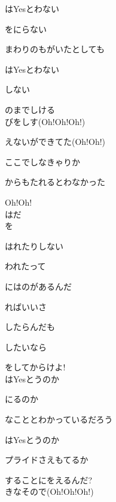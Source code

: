 はYesとわない

をにらない

まわりのもがいたとしても

はYesとわない

 しない

のまでしける
\\

びをしす(Oh!Oh!Oh!)

えないができてた(Oh!Oh!)

ここでしなきゃりか

からもたれるとわなかった

Oh!Oh!
\\

はだ
\\

を

はれたりしない

われたって

にはのがあるんだ

ればいいさ

したらんだも

したいなら

をしてからけよ!
\\

はYesとうのか

にるのか

なこととわかっているだろう

はYesとうのか

プライドさえもてるか

することにをえるんだ?
\\

きなそので(Oh!Oh!Oh!)

